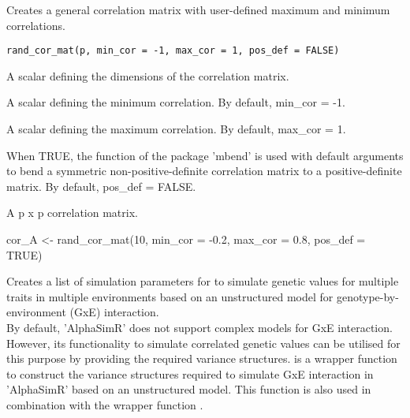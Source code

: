 \documentclass[a4paper]{book}
\begin{document}
%
\begin{Description}\relax
Creates a general  correlation matrix with user-defined maximum and minimum
correlations.
\end{Description}
%
\begin{Usage}
\begin{verbatim}
rand_cor_mat(p, min_cor = -1, max_cor = 1, pos_def = FALSE)
\end{verbatim}
\end{Usage}
%
\begin{Arguments}
\begin{ldescription}
\item[\code{p}] A scalar defining the dimensions of the correlation matrix.

\item[\code{min\_cor}] A scalar defining the minimum correlation. By default, min\_cor = -1.

\item[\code{max\_cor}] A scalar defining the maximum correlation. By default, max\_cor = 1.

\item[\code{pos\_def}] When TRUE, the function  of the package 'mbend' is used with
default arguments to bend a symmetric non-positive-definite correlation matrix to a
positive-definite matrix. By default, pos\_def = FALSE.
\end{ldescription}
\end{Arguments}
%
\begin{Value}
A p x p correlation matrix.
\end{Value}
%
\begin{Examples}
\begin{ExampleCode}
cor_A <- rand_cor_mat(10, min_cor = -0.2, max_cor = 0.8, pos_def = TRUE)
\end{ExampleCode}
\end{Examples}
%
\begin{Description}\relax
Creates a list of simulation parameters for
 to simulate
genetic values for multiple traits in multiple environments based on an unstructured model for
genotype-by-environment (GxE) interaction. \\{}
By default, 'AlphaSimR' does not support complex models for GxE interaction. However, its
functionality to simulate correlated genetic values can be utilised for this purpose by
providing the required variance structures.  is a wrapper function to
construct the variance structures required to simulate GxE interaction in 'AlphaSimR' based on
an unstructured model. This function is also used in combination with the
wrapper function .
\end{Description}
\end{document}
